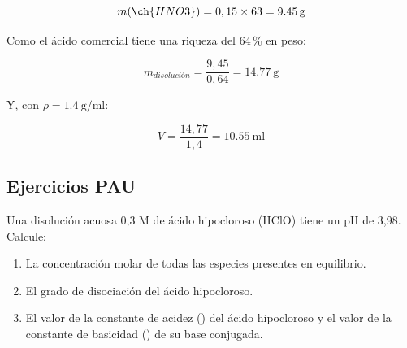 \begin{exercise}
\begin{solu}
        \begin{equation*}
            m(\ch{HNO3}) = 0,15 \times 63 = \SI{9.45}{\gram}
        \end{equation*}

        Como el ácido comercial tiene una riqueza del 64\,\% en peso:

        \begin{equation*}
            m_{disolución} = \dfrac{9,45}{0,64} = \SI{14.77}{\gram}
        \end{equation*}

        Y, con \(\rho = \SI{1.4}{\gram\per\milli\litre}\):

        \begin{equation*}
            V = \dfrac{14,77}{1,4} = \SI{10.55}{\milli\litre}
        \end{equation*}

    \end{solu}
\end{exercise}

\subsection{Ejercicios PAU}
\begin{exerciseEVAU}
Una disolución acuosa 0,3 M de ácido hipocloroso (HClO) tiene un pH de 3,98. Calcule:
  \begin{enumerate}[label=\letraminuscula]
      \item La concentración molar de todas las especies presentes en equilibrio.
      \item El grado de disociación del ácido hipocloroso.
      \item El valor de la constante de acidez (\Ka) del ácido hipocloroso y el valor de la constante de
basicidad (\Kb) de su base conjugada.
  \end{enumerate}
\begin{solu}

\end{solu}
\end{exerciseEVAU}

